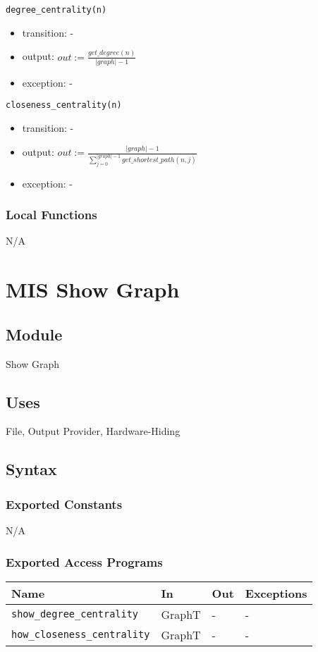 \documentclass[12pt, titlepage]{article}
\begin{document}
\noindent \texttt{degree\_centrality(n)}
\begin{itemize}
\item transition: -
\item output: $out:=\frac{get\_degree(n)}{|graph| - 1}  $
\item exception: - 
\end{itemize}

\noindent \texttt{closeness\_centrality(n)}
\begin{itemize}
\item transition: -
\item output: $out:= \frac{|graph|- 1}{\sum_{j=0}^{|graph|-1}{get\_shortest\_path(n,j)}} $
\item exception: - 
\end{itemize}

\subsubsection{Local Functions}
N/A
\newpage

\section{MIS Show Graph} \label{Module} 


\subsection{Module}
Show Graph

\subsection{Uses}
File, Output Provider, Hardware-Hiding
\subsection{Syntax}

\subsubsection{Exported Constants}
N/A
\subsubsection{Exported Access Programs}
\begin{center}
\begin{tabular}{|p{6cm}|p{2.5cm}|p{2.5cm}|p{4cm}|}
\hline
\textbf{Name} & \textbf{In} & \textbf{Out} & \textbf{Exceptions} \\
\hline
\texttt{show\_degree\_centrality} & GraphT& - & - \\
\texttt{how\_closeness\_centrality} & GraphT & - & - \\
\hline
\end{tabular}
\end{center}
\end{document}
